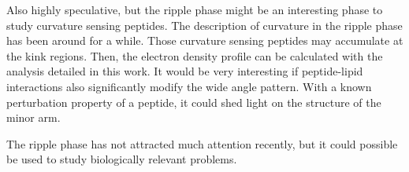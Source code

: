 Also highly speculative, but the ripple phase might be an interesting phase
to study curvature sensing peptides. The description of curvature in the
ripple phase has been around for a while. Those curvature sensing peptides
may accumulate at the kink regions. Then, the electron density profile
can be calculated with the analysis detailed in this work. It would 
be very interesting if peptide-lipid interactions also significantly 
modify the wide angle pattern. With a known perturbation property of 
a peptide, it could shed light on the structure of the minor arm.

The ripple phase has not attracted much attention recently, but
it could possible be used to study biologically relevant problems.
